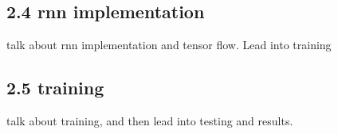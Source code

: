 
\subsection*{2.4 rnn implementation}

talk about rnn implementation and tensor flow. Lead into training

\subsection*{2.5 training}
talk about training, and then lead into testing and results.

